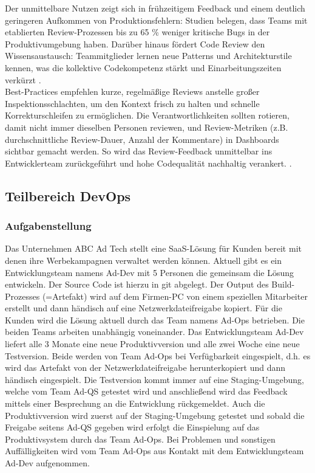 Der unmittelbare Nutzen zeigt sich in frühzeitigem Feedback und einem deutlich geringeren Aufkommen von Produktionsfehlern: 
Studien belegen, dass Teams mit etablierten Review-Prozessen bis zu 65 \% weniger kritische Bugs in der Produktivumgebung haben.\cite{bacchelli2013expectations}
Darüber hinaus fördert Code Review den Wissensaustausch: Teammitglieder lernen neue Patterns und Architekturstile kennen, was die kollektive Codekompetenz stärkt und Einarbeitungszeiten verkürzt \cite{rigby2013modern}. \\

Best-Practices empfehlen kurze, regelmäßige Reviews anstelle großer Inspektionsschlachten, um den Kontext frisch zu halten und schnelle Korrekturschleifen zu ermöglichen. 
Die Verantwortlichkeiten sollten rotieren, damit nicht immer dieselben Personen reviewen, und Review-Metriken (z.B. durchschnittliche Review-Dauer, Anzahl der Kommentare) in Dashboards sichtbar gemacht werden.
So wird das Review-Feedback unmittelbar ins Entwicklerteam zurückgeführt und hohe Codequalität nachhaltig verankert. \cite{atlassian2024code,rigby2013modern}.

\subsection{Teilbereich DevOps}

\subsubsection{Aufgabenstellung}

Das Unternehmen ABC Ad Tech stellt eine SaaS-Lösung für Kunden bereit mit denen ihre
Werbekampagnen verwaltet werden können.
Aktuell gibt es ein Entwicklungsteam namens  Ad-Dev  mit 5 Personen die gemeinsam die
Lösung entwickeln. Der Source Code ist hierzu in git abgelegt. Der Output des Build-Prozesses
(=Artefakt) wird auf dem Firmen-PC von einem speziellen Mitarbeiter erstellt und dann
händisch auf eine Netzwerkdateifreigabe kopiert.
Für die Kunden wird die Lösung aktuell durch das Team namens Ad-Ops betrieben.
Die beiden Teams arbeiten unabhängig voneinander.
Das Entwicklungsteam Ad-Dev liefert alle 3 Monate eine neue Produktivversion und alle
zwei Woche eine neue Testversion. Beide werden von Team Ad-Ops bei Verfügbarkeit
eingespielt, d.h. es wird das Artefakt von der Netzwerkdateifreigabe herunterkopiert und dann
händisch eingespielt. Die Testversion kommt immer auf eine Staging-Umgebung, welche
vom Team Ad-QS getestet wird und anschließend wird das Feedback mittels einer
Besprechung an die Entwicklung rückgemeldet. Auch die Produktivversion wird zuerst auf der
Staging-Umgebung getestet und sobald die Freigabe seitens  Ad-QS  gegeben wird erfolgt die
Einspielung auf das Produktivsystem durch das Team Ad-Ops. Bei Problemen und sonstigen
Auffälligkeiten wird vom Team  Ad-Ops  aus Kontakt mit dem Entwicklungsteam  Ad-Dev 
aufgenommen.\\


